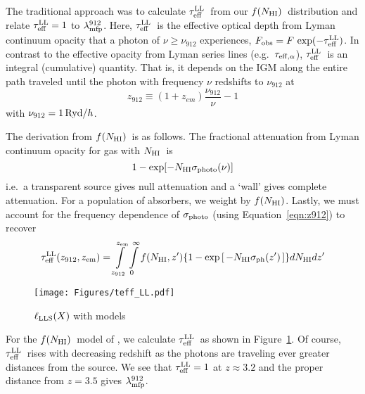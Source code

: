 \documentclass[graybox]{svmult}
\def\ltk{\left [ \,}
\def\rtk{\, \right  ] }
\def\intl{\int\limits}
\newcommand{\mnhi}{N_{\rm HI}}
\newcommand{\nhi}{$\mnhi$}
\def\mfnhi{f(\mnhi)}
\def\fnhi{$\mfnhi$}
\def\mlmfp{\lambda_{\rm mfp}^{912}}
\def\lmfp{$\mlmfp$}
\def\mtll{\tau_{\rm eff}^{\rm LL}}
\def\tll{$\mtll$}
\begin{document}
The traditional approach was to calculate \tll\ from our 
\fnhi\ distribution and relate $\mtll=1$ to \lmfp.
Here, \tll\ is the effective optical depth from Lyman continuum opacity
that a photon of $\nu \ge \nu_{912}$ experiences, 
$F_{\rm obs} = F \, \exp(-\mtll)$.
In contrast to the effective opacity from Lyman series lines
(e.g.\ $\tau_{\rm eff,\alpha}$), \tll\ is
an integral (cumulative) quantity.
That is, it depends on the IGM along the entire path traveled
until the photon with frequency $\nu$
redshifts to $\nu_{912}$ at 
\begin{equation}
z_{912} \equiv (1+z_{em}) \frac{\nu_{912}}{\nu}  - 1
\label{eqn:z912}
\end{equation}
with $\nu_{912} = {\rm 1\,Ryd}/h$.

The derivation from \fnhi\ is as follows.
The fractional attenuation from Lyman continuum opacity
for gas with \nhi\ is
\begin{equation}
1 - \exp [-\mnhi \sigma_{\rm photo}(\nu)]
\end{equation}
i.e.\ a transparent source gives null attenuation and 
a `wall' gives complete attenuation.
For a population of absorbers, we weight by 
\fnhi. Lastly, we 
must account for the frequency dependence of $\sigma_{\rm photo}$
(using Equation~\ref{eqn:z912}) to recover
\begin{equation}
\mtll(z_{912},z_{\rm em}) = \intl_{z_{912}}^{z_{\rm em}} \intl_0^\infty f(\mnhi,z')
   \lbrace 1 - \exp \ltk - \mnhi \sigma_{\rm ph}(z') \rtk \rbrace d\mnhi dz' 
\label{eqn:teff}
\end{equation}

%
\begin{figure}[b]
\sidecaption
\texttt{[image: Figures/teff\_LL.pdf]}
%
%
\caption{$\ell_{\rm LLS}(X)$ with models
}
\label{fig:teff_LL}       %
\end{figure}

For the \fnhi\ model of \cite{p14}, we calculate \tll\
as shown in Figure~\ref{fig:teff_LL}.
Of course, \tll\ rises with decreasing redshift as the photons
are traveling ever greater distances from the source.
We see that $\mtll = 1$ at $z \approx 3.2$ and the proper
distance from $z=3.5$ gives \lmfp.
\end{document}

